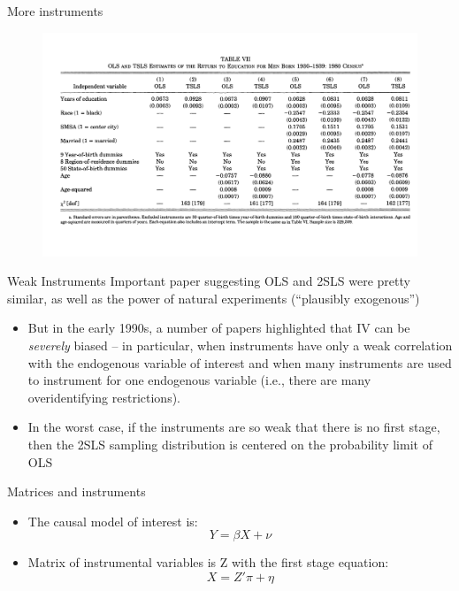 \documentclass{beamer}
\begin{document}
\begin{frame}{More instruments}

  \begin{figure}
    \includegraphics[scale=.18]{./lecture_includes/weak_qob3.png}
  \end{figure}


\end{frame}


\begin{frame}{Weak Instruments}
  Important paper suggesting OLS and 2SLS were pretty similar, as well as the power of natural experiments (``plausibly exogenous'')
  
  \begin{itemize}
    \item But in the early 1990s, a number of papers highlighted that IV can be \emph{severely} biased -- in particular, when instruments have only a weak correlation with the endogenous variable of interest and when many instruments are used to instrument for one endogenous variable (i.e., there are many overidentifying restrictions).
    \item In the worst case, if the instruments are so weak that there is no first stage, then the 2SLS sampling distribution is centered on the probability limit of OLS
  \end{itemize}
\end{frame}



\begin{frame}{Matrices and instruments}

  \begin{itemize}
    \item The causal model of interest is: $$Y=\beta X + \nu$$
    \item Matrix of instrumental variables is Z with the first stage equation:$$X = {Z'}\pi + \eta$$
  \end{itemize}

\end{frame}
\end{document}

